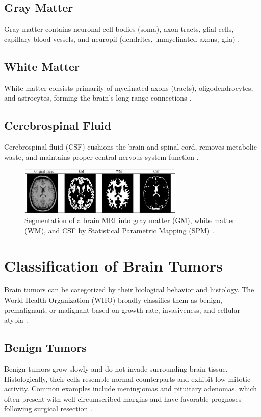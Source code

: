 \subsection*{Gray Matter}
Gray matter contains neuronal cell bodies (soma), axon tracts, glial cells, capillary blood vessels, and neuropil (dendrites, unmyelinated axons, glia) \cite{ref5}.

\subsection*{White Matter}
White matter consists primarily of myelinated axons (tracts), oligodendrocytes, and astrocytes, forming the brain’s long-range connections \cite{ref5}.

\subsection*{Cerebrospinal Fluid}
Cerebrospinal fluid (CSF) cushions the brain and spinal cord, removes metabolic waste, and maintains proper central nervous system function \cite{ref6}.

\begin{figure}[ht]
      \centering
      \includegraphics[width=0.7\textwidth]{Images/Chapter0/parts.png}
      \caption{Segmentation of a brain MRI into gray matter (GM), white matter (WM), and CSF by Statistical Parametric Mapping (SPM) \cite{ref7}.}
      \label{fig:spm-segmentation}
\end{figure}

\section{Classification of Brain Tumors}
\label{sec:classification-brain-tumors}

Brain tumors can be categorized by their biological behavior and histology. The World Health Organization (WHO) broadly classifies them as benign, premalignant, or malignant based on growth rate, invasiveness, and cellular atypia \cite{ref8}.

\subsection{Benign Tumors}
Benign tumors grow slowly and do not invade surrounding brain tissue. Histologically, their cells resemble normal counterparts and exhibit low mitotic activity. Common examples include meningiomas and pituitary adenomas, which often present with well‐circumscribed margins and have favorable prognoses following surgical resection \cite{ref8}.

